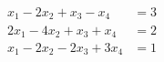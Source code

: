 \begin{align*}
x_1 - 2x_2 + x_3 - x_4 &= 3\\
2x_1 - 4x_2 + x_3 + x_4 &= 2\\
x_1 - 2x_2 - 2x_3 + 3x_4 &= 1
\end{align*}